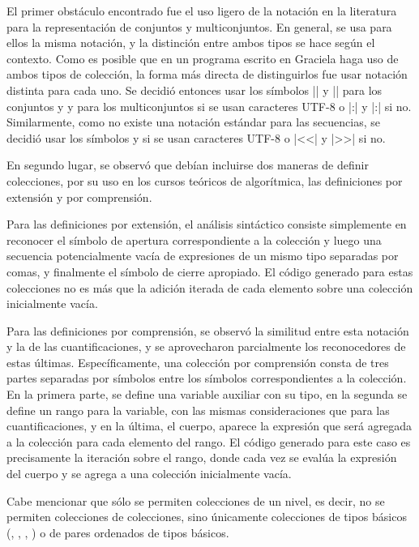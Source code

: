 {{El primer obstáculo encontrado fue el uso ligero de la notación en la literatura
para la representación de conjuntos y multiconjuntos. En general, se usa para
ellos la misma notación, y la distinción entre ambos tipos se hace según el
contexto. Como es posible que en un programa escrito en Graciela haga uso de
ambos tipos de colección, la forma más directa de distinguirlos fue usar
notación distinta para cada uno. Se decidió entonces usar los símbolos \ingra|{|
y \ingra|}| para los conjuntos y \Lbag{} y \Rbag{} para los multiconjuntos si se
usan caracteres UTF-8  o \ingra|{:| y \ingra|:}| si no. Similarmente, como no
existe una notación estándar para las secuencias, se decidió usar los símbolos
\Lseq{} y \Rseq{} si se usan caracteres UTF-8 o \ingra|<<| y \ingra|>>| si no.

En segundo lugar, se observó que debían incluirse dos maneras de definir
colecciones, por su uso en los cursos teóricos de algorítmica, las definiciones
por extensión y por comprensión.

Para las definiciones por extensión, el análisis sintáctico consiste simplemente
en reconocer el símbolo de apertura correspondiente a la colección y luego una
secuencia potencialmente vacía de expresiones de un mismo tipo separadas por
comas, y finalmente el símbolo de cierre apropiado. El código generado para
estas colecciones no es más que la adición iterada de cada elemento sobre una
colección inicialmente vacía.

Para las definiciones por comprensión, se observó la similitud entre esta
notación y la de las cuantificaciones, y se aprovecharon parcialmente los
reconocedores de estas últimas. Específicamente, una colección por comprensión
consta de tres partes separadas por símbolos \ingra{|} entre los símbolos
correspondientes a la colección. En la primera parte, se define una variable
auxiliar con su tipo, en la segunda se define un rango para la variable, con las
mismas consideraciones que para las cuantificaciones, y en la última, el cuerpo,
aparece la expresión que será agregada a la colección para cada elemento del
rango. El código generado para este caso es precisamente la iteración sobre el
rango, donde cada vez se evalúa la expresión del cuerpo y se agrega a una
colección inicialmente vacía.

Cabe mencionar que sólo se permiten colecciones de un nivel, es decir, no se
permiten colecciones de colecciones, sino únicamente colecciones de tipos
básicos (, , , ) o de pares
ordenados de tipos básicos.

}}
